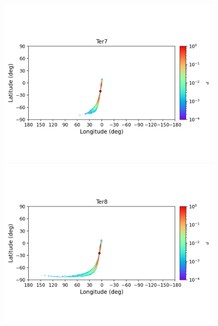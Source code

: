         \begin{figure}
            \begin{center}
                \includegraphics[clip=true, trim = 0mm 20mm 0mm 10mm, width=1\columnwidth]{images/error_plots_Ter7.png}
                \includegraphics[clip=true, trim = 0mm 20mm 0mm 10mm, width=1\columnwidth]{images/error_plots_Ter8.png}
                

\end{center}
\end{figure}
